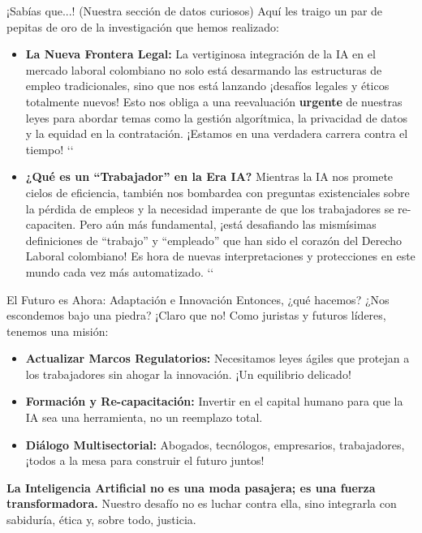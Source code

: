 \documentclass[aspectratio=169]{beamer}
\begin{document}
\begin{frame}{¡Sabías que...!  (Nuestra sección de datos curiosos)}
Aquí les traigo un par de pepitas de oro de la investigación que hemos realizado:
\begin{itemize}
  \item \textbf{La Nueva Frontera Legal:} La vertiginosa integración de la IA en el mercado laboral colombiano no solo está desarmando las estructuras de empleo tradicionales, sino que nos está lanzando ¡desafíos legales y éticos totalmente nuevos! Esto nos obliga a una reevaluación \textbf{urgente} de nuestras leyes para abordar temas como la gestión algorítmica, la privacidad de datos y la equidad en la contratación. ¡Estamos en una verdadera carrera contra el tiempo! `\cite{Eljach Mendoza, C. (2024)}`
  \item \textbf{¿Qué es un ``Trabajador'' en la Era IA?} Mientras la IA nos promete cielos de eficiencia, también nos bombardea con preguntas existenciales sobre la pérdida de empleos y la necesidad imperante de que los trabajadores se re-capaciten. Pero aún más fundamental, ¡está desafiando las mismísimas definiciones de ``trabajo'' y ``empleado'' que han sido el corazón del Derecho Laboral colombiano! Es hora de nuevas interpretaciones y protecciones en este mundo cada vez más automatizado. `\cite{Otero, L. (2023)}`
\end{itemize}
\end{frame}


\begin{frame}{El Futuro es Ahora: Adaptación e Innovación}
Entonces, ¿qué hacemos? ¿Nos escondemos bajo una piedra? ¡Claro que no! Como juristas y futuros líderes, tenemos una misión:
\begin{itemize}
  \item \textbf{Actualizar Marcos Regulatorios:} Necesitamos leyes ágiles que protejan a los trabajadores sin ahogar la innovación. ¡Un equilibrio delicado!
  \item \textbf{Formación y Re-capacitación:} Invertir en el capital humano para que la IA sea una herramienta, no un reemplazo total.
  \item \textbf{Diálogo Multisectorial:} Abogados, tecnólogos, empresarios, trabajadores, ¡todos a la mesa para construir el futuro juntos!
\end{itemize}
\textbf{La Inteligencia Artificial no es una moda pasajera; es una fuerza transformadora.} Nuestro desafío no es luchar contra ella, sino integrarla con sabiduría, ética y, sobre todo, justicia.
\end{frame}
\end{document}
